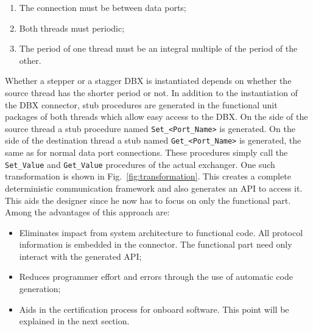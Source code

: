 \begin{enumerate}
\item{The connection must be between data ports;}
\item{Both threads must periodic;}
\item{The period of one thread must be an integral multiple of the
  period of the other.}
\end{enumerate}

Whether a stepper or a stagger DBX is instantiated depends on whether
the source thread has the shorter period or not. In addition to the
instantiation of the DBX connector, stub procedures are generated in
the functional unit packages of both threads which allow easy access
to the DBX. On the side of the source thread a stub procedure named
\texttt{Set\_<Port\_Name>} is generated. On the side of the
destination thread a stub named \texttt{Get\_<Port\_Name>} is
generated, the same as for normal data port connections. These
procedures simply call the \texttt{Set\_Value} and \texttt{Get\_Value}
procedures of the actual exchanger. One such transformation is shown
in Fig.~\ref{fig:transformation}. This creates a complete
deterministic communication framework and also generates an API to
access it. This aids the designer since he now has to focus on only
the functional part. Among the advantages of this approach are:

\begin{itemize}
\item{Eliminates impact from system architecture to functional
  code. All protocol information is embedded in the connector. The
  functional part need only interact with the generated API;}
\item{Reduces programmer effort and errors through the use of
  automatic code generation;}
\item{Aids in the certification process for onboard software. This
  point will be explained in the next section.}
\end{itemize}

